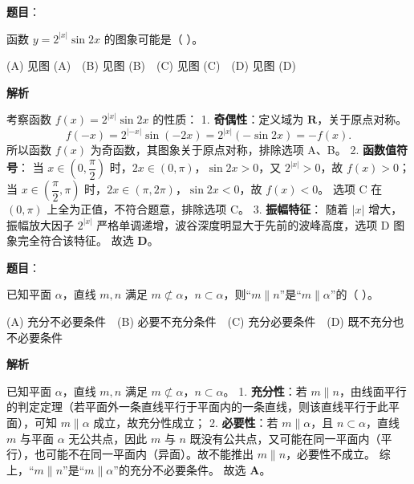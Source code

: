 \begin{answer}

\textbf{题目}：

函数 $y = 2^{|x|}\sin 2x$ 的图象可能是（ ）。
\nopagebreak[4]
\begin{center}\end{center}
\nopagebreak[4]
(A) 见图 (A)　(B) 见图 (B)　(C) 见图 (C)　(D) 见图 (D)

\textbf{解析}

考察函数 $f(x) = 2^{|x|}\sin 2x$ 的性质：
1. \textbf{奇偶性}：定义域为 $\mathbf R$，关于原点对称。
\nopagebreak[4]
\[f(-x) = 2^{|-x|}\sin(-2x) = 2^{|x|}(-\sin 2x) = -f(x).\]
   所以函数 $f(x)$ 为奇函数，其图象关于原点对称，排除选项 A、B。
2. \textbf{函数值符号}：
   当 $x \in \left(0, \dfrac\pi2\right)$ 时，$2x \in (0, \pi)$，$\sin 2x > 0$，又 $2^{|x|} > 0$，故 $f(x) > 0$；
   当 $x \in \left(\dfrac\pi2, \pi\right)$ 时，$2x \in (\pi, 2\pi)$，$\sin 2x < 0$，故 $f(x) < 0$。
   选项 C 在 $(0, \pi)$ 上全为正值，不符合题意，排除选项 C。
3. \textbf{振幅特征}：
   随着 $|x|$ 增大，振幅放大因子 $2^{|x|}$ 严格单调递增，波谷深度明显大于先前的波峰高度，选项 D 图象完全符合该特征。
故选 \textbf{D}。


\end{answer}
\begin{answer}

\textbf{题目}：

已知平面 $\alpha$，直线 $m, n$ 满足 $m \not\subset \alpha$，$n \subset \alpha$，则“$m \parallel n$”是“$m \parallel \alpha$”的（ ）。

(A) 充分不必要条件　(B) 必要不充分条件　(C) 充分必要条件　(D) 既不充分也不必要条件

\textbf{解析}

已知平面 $\alpha$，直线 $m, n$ 满足 $m \not\subset \alpha$，$n \subset \alpha$。
1. \textbf{充分性}：若 $m \parallel n$，由线面平行的判定定理（若平面外一条直线平行于平面内的一条直线，则该直线平行于此平面），可知 $m \parallel \alpha$ 成立，故充分性成立；
2. \textbf{必要性}：若 $m \parallel \alpha$，且 $n \subset \alpha$，直线 $m$ 与平面 $\alpha$ 无公共点，因此 $m$ 与 $n$ 既没有公共点，又可能在同一平面内（平行），也可能不在同一平面内（异面）。故不能推出 $m \parallel n$，必要性不成立。
综上，“$m \parallel n$”是“$m \parallel \alpha$”的充分不必要条件。
故选 \textbf{A}。


\end{answer}
